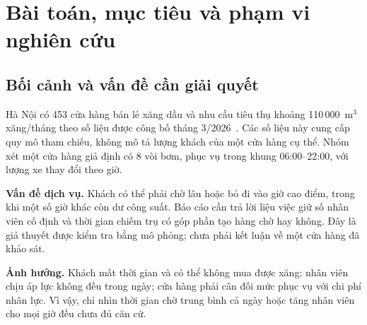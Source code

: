 
\section{Bài toán, mục tiêu và phạm vi nghiên cứu}
\label{r1:scope}
\subsection{Bối cảnh và vấn đề cần giải quyết}
Hà Nội có 453 cửa hàng bán lẻ xăng dầu và nhu cầu tiêu thụ khoảng
110\,000~m$^3$ xăng/tháng theo số liệu được công bố tháng 3/2026~\cite{sct2026}.
Các số liệu này cung cấp quy mô tham chiếu, không mô tả lượng khách của một
cửa hàng cụ thể. Nhóm xét một cửa hàng giả định có 8 vòi bơm, phục vụ trong
khung 06:00--22:00, với lượng xe thay đổi theo giờ.

\textbf{Vấn đề dịch vụ.} Khách có thể phải chờ lâu hoặc bỏ đi vào giờ cao
điểm, trong khi một số giờ khác còn dư công suất. Báo cáo cần trả lời liệu
việc giữ số nhân viên cố định và thời gian chiếm trụ có góp phần tạo hàng
chờ hay không. Đây là giả thuyết được kiểm tra bằng mô phỏng; chưa phải
kết luận về một cửa hàng đã khảo sát.

\textbf{Ảnh hưởng.} Khách mất thời gian và có thể không mua được xăng;
nhân viên chịu áp lực không đều trong ngày; cửa hàng phải cân đối mức phục
vụ với chi phí nhân lực. Vì vậy, chỉ nhìn thời gian chờ trung bình cả ngày
hoặc tăng nhân viên cho mọi giờ đều chưa đủ căn cứ.

